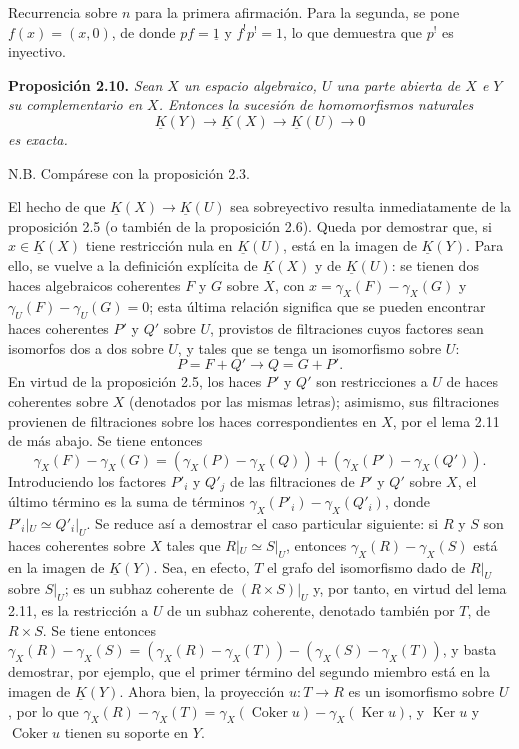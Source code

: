 Recurrencia sobre $n$ para la primera afirmación. Para la segunda, se pone $f(x)=(x,0)$, de donde $pf=\underline{1}$ y $f^!p^!=1$, lo que demuestra que $p^!$ es inyectivo.

\textbf{Proposición 2.10.} \emph{Sean $X$ un espacio algebraico, $U$ una parte abierta de $X$ e $Y$ su complementario en $X$. Entonces la sucesión de homomorfismos naturales}
\begin{equation}\tag{2.30}
 \underline K(Y)\longrightarrow\underline K(X)\longrightarrow\underline K(U)\longrightarrow 0
\end{equation}
\emph{es exacta.}

N.B. Compárese con la proposición 2.3.

El hecho de que $\underline K(X)\longrightarrow\underline K(U)$ sea sobreyectivo resulta inmediatamente de la proposición 2.5 (o también de la proposición 2.6). Queda por demostrar que, si $x\in\underline K(X)$ tiene restricción nula en $\underline K(U)$, está en la imagen de $\underline K(Y)$. Para ello, se vuelve a la definición explícita de $\underline K(X)$ y de $\underline K(U)$: se tienen dos haces algebraicos coherentes $F$ y $G$ sobre $X$, con $x=\gamma_X(F)-\gamma_X(G)$ y $\gamma_U(F)-\gamma_U(G)=0$; esta última relación significa que se pueden encontrar haces coherentes $P'$ y $Q'$ sobre $U$, provistos de filtraciones cuyos factores sean isomorfos dos a dos sobre $U$, y tales que se tenga un isomorfismo sobre $U$:
\[
 P=F+Q'\longrightarrow Q=G+P'.
\]
En virtud de la proposición 2.5, los haces $P'$ y $Q'$ son restricciones a $U$ de haces coherentes sobre $X$ (denotados por las mismas letras); asimismo, sus filtraciones provienen de filtraciones sobre los haces correspondientes en $X$, por el lema 2.11 de más abajo. Se tiene entonces
\[
 \gamma_X(F)-\gamma_X(G)=(\gamma_X(P)-\gamma_X(Q))+(\gamma_X(P')-\gamma_X(Q')).
\]
Introduciendo los factores $P'_i$ y $Q'_j$ de las filtraciones de $P'$ y $Q'$ sobre $X$, el último término es la suma de términos $\gamma_X(P'_i)-\gamma_X(Q'_i)$, donde $P'_i|_U\simeq Q'_i|_U$. Se reduce así a demostrar el caso particular siguiente: si $R$ y $S$ son haces coherentes sobre $X$ tales que $R|_U\simeq S|_U$, entonces $\gamma_X(R)-\gamma_X(S)$ está en la imagen de $\underline K(Y)$. Sea, en efecto, $T$ el grafo del isomorfismo dado de $R|_U$ sobre $S|_U$; es un subhaz coherente de $(R\times S)|_U$ y, por tanto, en virtud del lema 2.11, es la restricción a $U$ de un subhaz coherente, denotado también por $T$, de $R\times S$. Se tiene entonces $\gamma_X(R)-\gamma_X(S)=(\gamma_X(R)-\gamma_X(T))-(\gamma_X(S)-\gamma_X(T))$, y basta demostrar, por ejemplo, que el primer término del segundo miembro está en la imagen de $\underline K(Y)$. Ahora bien, la proyección $u:T\longrightarrow R$ es un isomorfismo sobre $U$, por lo que $\gamma_X(R)-\gamma_X(T)=\gamma_X(\operatorname{Coker}u)-\gamma_X(\operatorname{Ker}u)$, y $\operatorname{Ker}u$ y $\operatorname{Coker}u$ tienen su soporte en $Y$.

